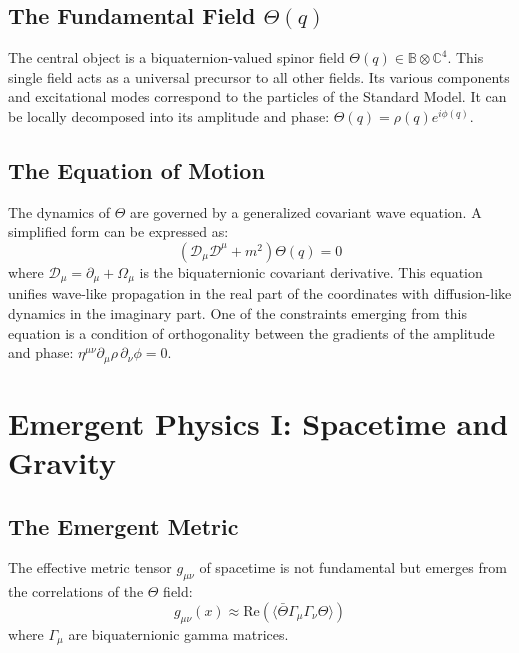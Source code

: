 \documentclass[12pt, a4paper]{article}
\begin{document}
\subsection{The Fundamental Field \( \Theta(q) \)}
The central object is a biquaternion-valued spinor field \( \Theta(q) \in \mathbb{B} \otimes \mathbb{C}^4 \). This single field acts as a universal precursor to all other fields. Its various components and excitational modes correspond to the particles of the Standard Model. It can be locally decomposed into its amplitude and phase: \( \Theta(q) = \rho(q) e^{i\phi(q)} \).

\subsection{The Equation of Motion}
The dynamics of \( \Theta \) are governed by a generalized covariant wave equation. A simplified form can be expressed as:
\begin{equation}
    \left( \mathcal{D}_\mu \mathcal{D}^\mu + m^2 \right) \Theta(q) = 0
\end{equation}
where \( \mathcal{D}_\mu = \partial_\mu + \Omega_\mu \) is the biquaternionic covariant derivative. This equation unifies wave-like propagation in the real part of the coordinates with diffusion-like dynamics in the imaginary part. One of the constraints emerging from this equation is a condition of orthogonality between the gradients of the amplitude and phase: \( \eta^{\mu\nu} \partial_\mu \rho \, \partial_\nu \phi = 0 \).

\section{Emergent Physics I: Spacetime and Gravity}

\subsection{The Emergent Metric}
The effective metric tensor \( g_{\mu\nu} \) of spacetime is not fundamental but emerges from the correlations of the \( \Theta \) field:
\begin{equation}
g_{\mu\nu}(x) \approx \text{Re}(\langle \bar{\Theta} \Gamma_\mu \Gamma_\nu \Theta \rangle)
\end{equation}
where \( \Gamma_\mu \) are biquaternionic gamma matrices.
\end{document}
